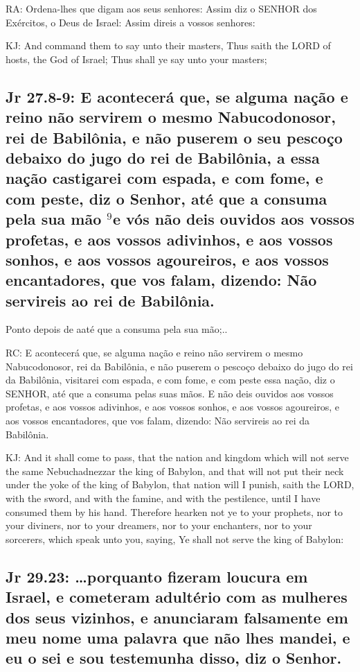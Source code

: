 RA: Ordena-lhes que digam aos seus senhores: Assim diz o SENHOR dos Exércitos, o Deus de Israel: Assim direis a vossos senhores:

KJ: And command them to say unto their masters, Thus saith the LORD of hosts, the God of Israel; Thus shall ye say unto your masters;

\subsection{Jr 27.8-9: E acontecerá que, se alguma nação e reino não servirem o mesmo Nabucodonosor, rei de Babilônia, e não puserem o seu pescoço debaixo do jugo do rei de Babilônia, a essa nação castigarei com espada, e com fome, e com peste, diz o Senhor, até que a consuma pela sua mão\uwave{;} $^{\mathrm{9}}$e vós não deis ouvidos aos vossos profetas, e aos vossos adivinhos, e aos vossos sonhos, e aos vossos agoureiros, e aos vossos encantadores, que vos falam, dizendo: Não servireis ao rei de Babilônia.}

Ponto depois de aaté que a consuma pela sua mão;..

RC: E acontecerá que, se alguma nação e reino não servirem o mesmo Nabucodonosor, rei da Babilônia, e não puserem o pescoço debaixo do jugo do rei da Babilônia, visitarei com espada, e com fome, e com peste essa nação, diz o SENHOR, até que a consuma pelas suas mãos. E não deis ouvidos aos vossos profetas, e aos vossos adivinhos, e aos vossos sonhos, e aos vossos agoureiros, e aos vossos encantadores, que vos falam, dizendo: Não servireis ao rei da Babilônia.

KJ: And it shall come to pass, that the nation and kingdom which will not serve the same Nebuchadnezzar the king of Babylon, and that will not put their neck under the yoke of the king of Babylon, that nation will I punish, saith the LORD, with the sword, and with the famine, and with the pestilence, until I have consumed them by his hand. Therefore hearken not ye to your prophets, nor to your diviners, nor to your dreamers, nor to your enchanters, nor to your sorcerers, which speak unto you, saying, Ye shall not serve the king of Babylon:

\subsection{Jr 29.23: \ldots porquanto fizeram loucura em Israel, e cometeram adultério com as mulheres dos seus vizinhos, e anunciaram falsamente\uwave{,} em meu nome uma palavra\uwave{,} que não lhes mandei, e eu o sei e sou testemunha disso, diz o Senhor.}

